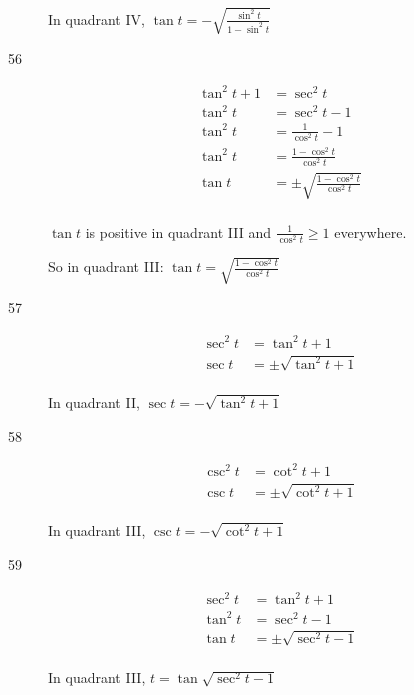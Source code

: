 \documentclass{exam}
\begin{document}
\begin{description}
        In quadrant IV, $\tan t = \boxed{ - \sqrt{ \frac{\sin^2 t}{1 - \sin^2 t} } }$

      \item[56] 
        \begin{align*}
          \tan^2 t + 1 & = \sec^2 t \\
          \tan^2 t     & = \sec^2 t - 1 \\
          \tan^2 t     & = \frac{1}{\cos^2 t} - 1 \\
          \tan^2 t     & = \frac{1 - \cos^2 t}{\cos^2 t} \\
          \tan t     & = \pm \sqrt{ \frac{1 - \cos^2 t}{\cos^2 t} } \\
        \end{align*}

        $\tan t$ is positive in quadrant III and $\frac{1}{\cos^2 t} \geq 1$ everywhere.  
        
        So in quadrant III: $\tan t = \boxed{ \sqrt{ \frac{1 - \cos^2 t}{\cos^2 t} } }$

      \item[57] 
        \begin{align*}
          \sec^2 t & = \tan^2 t + 1 \\
          \sec t   & = \pm \sqrt{\tan^2 t + 1} \\
        \end{align*}

        In quadrant II, $\sec t = \boxed{ - \sqrt{\tan^2 t + 1} }$ 

      \item[58] 
        \begin{align*}
          \csc^2 t & = \cot^2 t + 1 \\
          \csc t   & = \pm \sqrt{\cot^2 t + 1} \\
        \end{align*}

        In quadrant III, $\csc t = \boxed{ - \sqrt{\cot^2 t + 1} }$ 

      \item[59] 
        \begin{align*}
          \sec^2 t & = \tan^2 t + 1 \\
          \tan^2 t & = \sec^2 t - 1 \\
          \tan t   & = \pm \sqrt{ \sec^2 t - 1 } \\
        \end{align*}

        In quadrant III, $t = \boxed{\tan \sqrt{ \sec^2 t - 1 }}$ 


\end{description}
\end{document}
